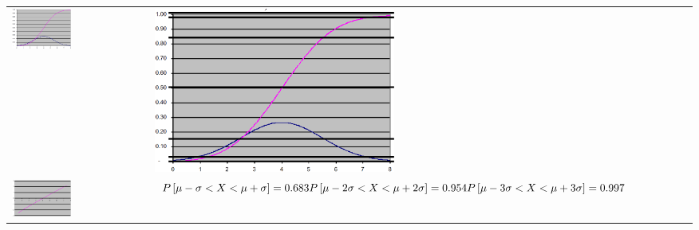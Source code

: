 \documentclass[
  10pt,
  ignorenonframetext,
]{beamer}
\begin{document}
\begin{frame}{}
\protect\hypertarget{section-44}{}
\begin{longtable}[]{@{}
  >{\raggedleft\arraybackslash}p{}
  >{\raggedright\arraybackslash}p{}@{}}
\toprule()
\endhead
\includegraphics[width=0.45\textwidth,height=\textheight]{figuras/Papel3.png}
&
\includegraphics[width=0.45\textwidth,height=\textheight]{figuras/Papel4.png} \\
\includegraphics[width=0.45\textwidth,height=\textheight]{figuras/Papel5.png}
&
\(P\left[ \mu -\sigma <X<\mu +\sigma \right] = 0.683 \newline P\left[ \mu -2\sigma <X<\mu +2\sigma \right] = 0.954 \newline P\left[ \mu -3\sigma <X<\mu +3\sigma \right] = 0.997\) \\
\bottomrule()
\end{longtable}
\end{frame}
\end{document}

